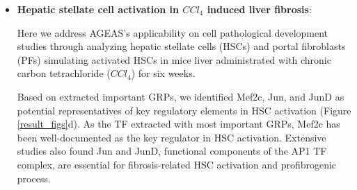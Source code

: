 \documentclass[fleqn,10pt]{wlscirep}
\begin{document}
\begin{itemize}

      \item {\textbf{Hepatic stellate cell activation in $CCl_4$ induced liver fibrosis}}:

        Here we address AGEAS's applicability on cell pathological development studies through analyzing hepatic stellate cells (HSCs) and portal fibroblasts (PFs) simulating activated HSCs in mice liver administrated with chronic carbon tetrachloride ($CCl_4$) for six weeks.

        Based on extracted important GRPs, we identified Mef2c, Jun, and JunD as potential representatives of key regulatory elements in HSC activation (Figure \ref{result_figs}d).
        As the TF extracted with most important GRPs, Mef2c has been well-documented as the key regulator in HSC activation. \cite{mef2c_1, mef2c_2, mef2c_3}
        Extensive studies also found Jun and JunD, functional components of the AP1 TF complex, are essential for fibrosis-related HSC activation and profibrogenic process. \cite{ap1_hsc_1, ap1_hsc_2, ap1_hsc_3, ap1_hsc_4}


\end{itemize}
\end{document}
